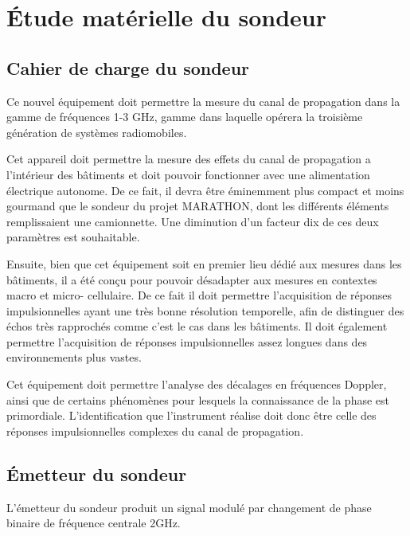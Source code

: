 \section{Étude matérielle du sondeur}

\subsection{Cahier de charge du sondeur}
Ce nouvel équipement doit permettre la mesure du canal de propagation dans la gamme
de fréquences 1-3 GHz, gamme dans laquelle opérera la troisième génération de systèmes radiomobiles.

Cet appareil doit permettre la mesure des effets du canal de propagation a l'intérieur des bâtiments et doit pouvoir fonctionner avec une alimentation électrique autonome. De ce fait, il devra être éminemment plus compact et moins gourmand que le sondeur du projet MARATHON, dont les différents éléments remplissaient une camionnette. Une diminution d’un facteur dix de ces deux paramètres est souhaitable.

Ensuite, bien que cet équipement soit en premier lieu dédié aux mesures dans les
bâtiments, il a été conçu pour pouvoir désadapter aux mesures en contextes macro et micro- cellulaire. De ce fait il doit permettre l’acquisition de réponses impulsionnelles ayant une très bonne résolution temporelle, afin de distinguer des échos très rapprochés comme c'est le cas dans les bâtiments. Il doit également permettre l’acquisition de réponses impulsionnelles assez longues dans des environnements plus vastes.

Cet équipement doit permettre l’analyse des décalages en fréquences Doppler, ainsi que de certains phénomènes pour lesquels la connaissance de la phase est primordiale.
L’identification que l’instrument réalise doit donc être celle des réponses impulsionnelles complexes du canal de propagation. 

\subsection{Émetteur du sondeur}

L'émetteur du sondeur produit un signal modulé par changement de phase binaire de fréquence centrale 2GHz.
\\


